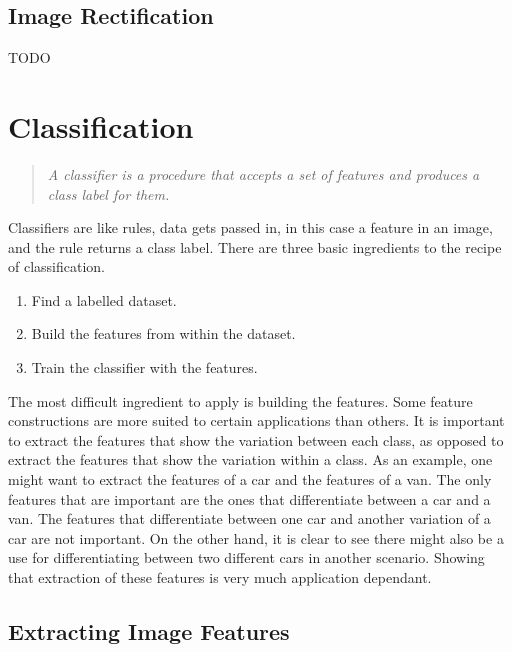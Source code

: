 \documentclass[11pt,oneside]{report}
\begin{document}
				\subsection{Image Rectification}
				 TODO
				
			\section{Classification}
				\begin{quote}
					\textit{A classifier is a procedure that accepts a set of features and produces a class label for them.}
					\cite[p. 487]{book:modern}
				\end{quote}
				Classifiers are like rules, data gets passed in, in this case a feature in an image, and the rule returns a class label.
				There are three basic ingredients to the recipe of classification.
				\begin{enumerate}
					\item{Find a labelled dataset.}
					\item{Build the features from within the dataset.}
					\item{Train the classifier with the features.}
				\end{enumerate}
				The most difficult ingredient to apply is building the features.
				Some feature constructions are more suited to certain applications than others.
				It is important to extract the features that show the variation between each class, as opposed to extract the features that show the variation within a class.
				As an example, one might want to extract the features of a car and the features of a van.
				The only features that are important are the ones that differentiate between a car and a van.
				The features that differentiate between one car and another variation of a car are not important.
				On the other hand, it is clear to see there might also be a use for differentiating between two different cars in another scenario.
				Showing that extraction of these features is very much application dependant.
				
				\subsection{Extracting Image Features}
\end{document}
